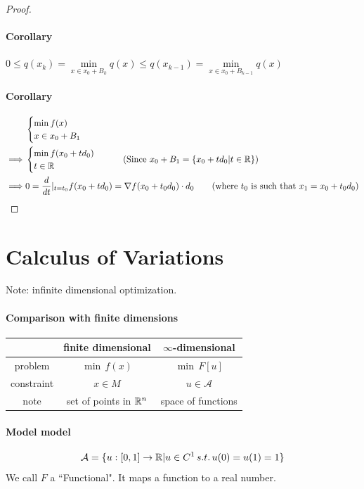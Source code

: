 \documentclass[11pt]{article}
\begin{document}
\begin{proof}
\paragraph{Corollary} $0 \leq q(x_{k}) = \underset{x \in x_0 + B_k}{\min} q(x) \leq q(x_{k-1}) = \underset{x \in x_0 + B_{k-1}}{\min} q(x)$
\paragraph{Corollary}
\begin{align}
&\begin{cases}
	\min f(x) \\
	x \in x_0 + B_1
\end{cases} \\
\implies &\begin{cases}
	\min f(x_0 + td_0) \\
	t \in \real
\end{cases}\tag{Since $x_0 + B_1 = \{x_0 + td_0 | t \in \real \}$} \\
\implies &0 = \frac{d}{dt}|_{t=t_0} f(x_0 + td_0) = \nabla f(x_0 + t_0d_0) \cdot d_0 \tag{where $t_0$ is such that $x_1 = x_0 + t_0 d_0$}
\end{align}
\end{proof}

\section{Calculus of Variations}
Note: infinite dimensional optimization.
\paragraph{Comparison with finite dimensions}
\begin{center}
\begin{tabular}{ |c|c|c| } 
 \hline
 & finite dimensional & $\infty$-dimensional \\
 \hline
 problem & $\min \, f(x)$ & $\min \, F[u]$ \\
 \hline
 constraint & $x \in M$ & $u \in \mathcal{A}$ \\ 
 \hline
 note & set of points in $\mathbb{R}^n$ & space of functions \\
 \hline
\end{tabular}
\end{center}
\paragraph{Model model}
$$\mathcal{A} =  \{ u: [0,1] \rightarrow \mathbb{R} | u \in C^1 \, s.t. \, u(0) = u(1) = 1\}$$
 We call $F$ a ``Functional". It maps a function to a real number.
\end{document}
